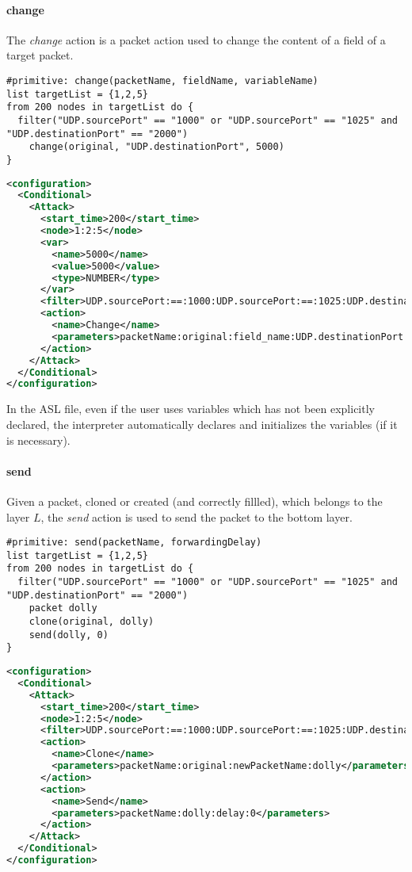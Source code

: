 \paragraph{change}
The \emph{change} action is a packet action used to change the content of a field of a target packet.
%
\begin{lstlisting}[language={asl},caption={ASL change example}]
#primitive: change(packetName, fieldName, variableName)
list targetList = {1,2,5}
from 200 nodes in targetList do {
  filter("UDP.sourcePort" == "1000" or "UDP.sourcePort" == "1025" and "UDP.destinationPort" == "2000")
    change(original, "UDP.destinationPort", 5000)
}
\end{lstlisting}
%
\begin{lstlisting}[language={xml},caption={Interpreter output}]
<configuration>
  <Conditional>
    <Attack>
      <start_time>200</start_time>
      <node>1:2:5</node>
      <var>
        <name>5000</name>
        <value>5000</value>
        <type>NUMBER</type>
      </var>
      <filter>UDP.sourcePort:==:1000:UDP.sourcePort:==:1025:UDP.destinationPort:==:2000:AND:OR</filter>
      <action>
        <name>Change</name>
        <parameters>packetName:original:field_name:UDP.destinationPort:value:5000</parameters>
      </action>
    </Attack>
  </Conditional>
</configuration>
\end{lstlisting}
%
In the ASL file, even if the user uses variables which has not been explicitly declared, the interpreter automatically declares and initializes the variables (if it is necessary).

\paragraph{send}
Given a packet, cloned or created (and correctly fillled), which belongs to the layer $L$, the \emph{send} action is used to send the packet to the bottom layer.
%
\begin{lstlisting}[language={asl},caption={ASL send example}]
#primitive: send(packetName, forwardingDelay)
list targetList = {1,2,5}
from 200 nodes in targetList do {
  filter("UDP.sourcePort" == "1000" or "UDP.sourcePort" == "1025" and "UDP.destinationPort" == "2000")
    packet dolly
    clone(original, dolly)
    send(dolly, 0)
}
\end{lstlisting}
%
\begin{lstlisting}[language={xml},caption={Interpreter output}]
<configuration>
  <Conditional>
    <Attack>
      <start_time>200</start_time>
      <node>1:2:5</node>
      <filter>UDP.sourcePort:==:1000:UDP.sourcePort:==:1025:UDP.destinationPort:==:2000:AND:OR</filter>
      <action>
        <name>Clone</name>          
        <parameters>packetName:original:newPacketName:dolly</parameters>                        
      </action>
      <action>
        <name>Send</name>
        <parameters>packetName:dolly:delay:0</parameters>
      </action>
    </Attack>
  </Conditional>
</configuration>
\end{lstlisting}

